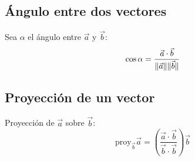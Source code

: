     \subsection{Ángulo entre dos vectores} Sea $\alpha$ el ángulo entre $\vec{a}$ y $\vec{b}$:
	\begin{equation*}
	  \cos \alpha = \frac{\vec{a} \cdot \vec{b}}{\lVert\vec{a}\rVert \lVert\vec{b}\rVert}
	\end{equation*}
   
    \subsection{Proyección de un vector} Proyección de $\vec{a}$ sobre $\vec{b}$:
	\begin{equation*}
	  \text{proy} _ {\vec{b}} \vec{a} = (\frac{\vec{a} \cdot \vec{b}}{\vec{b} \cdot \vec{b}}) \vec{b}
	\end{equation*}